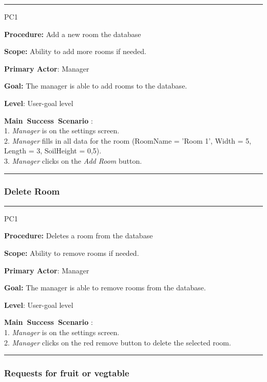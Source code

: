\vspace{0.5cm}
\hrule
\hfill \break
\begin{lyxlist}{PC1}
\small{
\item [\textbf{Procedure:}] Add a new room the database
\item [\textbf{Scope:}] Ability to add more rooms if needed.
\item [\textbf{Primary Actor}:] Manager
\item [\textbf{Goal:}] The manager is able to add rooms to the database.
\item [\textbf{Level}:] User-goal level
\item [\textbf{Main~Success~Scenario}]:\\
1. \emph{Manager} is on the settings screen. \\
2. \emph{Manager} fills in all data for the room (RoomName = 'Room 1', Width
= 5, Length = 3, SoilHeight = 0,5).\\
3. \emph{Manager} clicks on the \emph{Add Room} button.
}
\end{lyxlist}
\hrule
\vspace{0.5cm}
\break




\subsubsection{Delete Room}

\vspace{0.5cm}
\hrule
\hfill \break
\begin{lyxlist}{PC1}
\small{
\item [\textbf{Procedure:}] Deletes a room from the database
\item [\textbf{Scope:}] Ability to remove rooms if needed.
\item [\textbf{Primary Actor}:] Manager
\item [\textbf{Goal:}] The manager is able to remove rooms from the database.
\item [\textbf{Level}:] User-goal level
\item [\textbf{Main~Success~Scenario}]:\\
1. \emph{Manager} is on the settings screen. \\
2. \emph{Manager} clicks on the red remove button to delete the selected room.
}
\end{lyxlist}
\hrule
\vspace{0.5cm}
\break




\subsubsection{Requests for fruit or vegtable}

